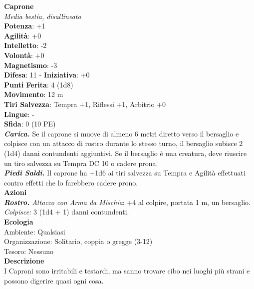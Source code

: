 \begin{multicols}{2}
\medskip\textbf{Caprone}\\
\emph{Media bestia, disallineato}\\
\textbf{Potenza}: +1\\
\textbf{Agilità}: +0\\
\textbf{Intelletto}: -2\\
\textbf{Volontà}: +0\\
\textbf{Magnetismo}: -3\\
\textbf{Difesa}: 11 - \textbf{Iniziativa}: +0\\
\textbf{Punti Ferita}: 4 (1d8)\\
\textbf{Movimento}: 12 m\\
\textbf{Tiri Salvezza}: Tempra +1, Riflessi +1, Arbitrio +0 \\
\textbf{Lingue}: -\\
\textbf{Sfida}: 0 (10 PE)\smallskip\\
\emph{\textbf{Carica.}} Se il caprone si muove di almeno 6 metri diretto verso il bersaglio e colpisce con un attacco di rostro durante lo stesso turno, il bersaglio subisce 2 (1d4) danni contundenti aggiuntivi. Se il bersaglio è una creatura, deve riuscire un tiro salvezza su Tempra DC 10 o cadere prona.\\
\emph{\textbf{Piedi Saldi.}} Il caprone ha +1d6 ai tiri salvezza su Tempra e Agilità effettuati contro effetti che lo farebbero cadere prono.  \\
\smallskip\textbf{Azioni}\\
\emph{\textbf{Rostro.} Attacco con Arma da Mischia}: +4 al colpire, portata 1 m, un bersaglio.\\
\emph{Colpisce:} 3 (1d4 + 1) danni contundenti.\\
\textbf{Ecologia}\\
Ambiente: Qualsiasi\\
Organizzazione: Solitario, coppia o gregge (3-12)\\
Tesoro: Nessuno\\
\textbf{Descrizione}\\
I Caproni sono irritabili e testardi, ma sanno trovare cibo nei luoghi più strani e possono digerire quasi ogni cosa. \\


\end{multicols}
